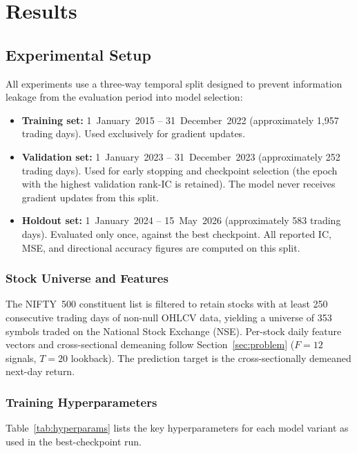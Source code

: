 \documentclass[a4paper,11pt]{report}
\begin{document}
\chapter{Results}
\label{ch:Results}

\section{Experimental Setup}

All experiments use a three-way temporal split designed to prevent information leakage from the evaluation period into model selection:

\begin{itemize}
    \item \textbf{Training set:} 1~January~2015 -- 31~December~2022 (approximately 1,957 trading days). Used exclusively for gradient updates.
    \item \textbf{Validation set:} 1~January~2023 -- 31~December~2023 (approximately 252 trading days). Used for early stopping and checkpoint selection (the epoch with the highest validation rank-IC is retained). The model never receives gradient updates from this split.
    \item \textbf{Holdout set:} 1~January~2024 -- 15~May~2026 (approximately 583 trading days). Evaluated only once, against the best checkpoint. All reported IC, MSE, and directional accuracy figures are computed on this split.
\end{itemize}


\subsection{Stock Universe and Features}

The NIFTY~500 constituent list is filtered to retain stocks with at least 250 consecutive trading days of non-null OHLCV data, yielding a universe of 353 symbols traded on the National Stock Exchange (NSE). Per-stock daily feature vectors and cross-sectional demeaning follow Section~\ref{sec:problem} ($F=12$ signals, $T=20$ lookback). The prediction target is the cross-sectionally demeaned next-day return.

\subsection{Training Hyperparameters}

Table~\ref{tab:hyperparams} lists the key hyperparameters for each model variant as used in the best-checkpoint run.
\end{document}
